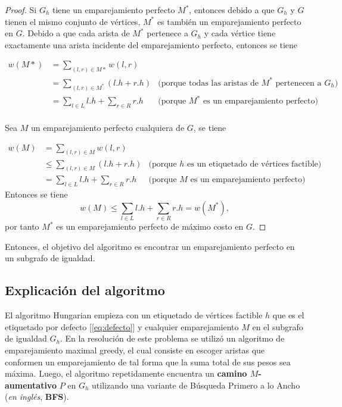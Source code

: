 \documentclass[10pt]{article} %
\begin{document}
	\begin{proof}
		Si $G_h$ tiene un emparejamiento perfecto $M^*$, entonces debido a que $G_h$ y $G$ tienen el mismo conjunto de v\'ertices, $M^*$ es tambi\'en un emparejamiento perfecto en $G$. Debido a que cada arista de $M^*$ pertenece a $G_h$ y cada v\'ertice tiene exactamente una arista incidente del emparejamiento perfecto, entonces se tiene
		
		\begin{align}
			w(M*) &= \sum_{(l,r) \in M*} w(l,r)\\
			&= \sum_{(l,r) \in M^*}(l.h + r.h) &\text{(porque todas las aristas de $M^*$ pertenecen a $G_h$)}\\
			&= \sum_{l \in L}l.h + \sum_{r \in R} r.h &\text{(porque $M^{*}$ es un emparejamiento perfecto)}\\
		\end{align} 
		
		Sea $M$ un emparejamiento perfecto cualquiera de $G$, se tiene
		
		\begin{align}
			w(M) &= \sum_{(l,r) \in M} w(l,r)\\
			&\leq \sum_{(l,r) \in M} (l.h + r.h) &\text{(porque $h$ es un etiquetado de v\'ertices factible)}\\
			&= \sum_{l \in L} l.h + \sum_{r \in R} r.h &\text{(porque $M$ es un emparejamiento perfecto)}
		\end{align}
		Entonces se tiene
		\begin{equation}
			w(M) \leq \sum_{l \in L} l.h + \sum_{r \in R} r.h = w(M^*),
		\end{equation}
		por tanto $M^*$ es un emparejamiento perfecto de m\'aximo costo en $G$.
	\end{proof}
	
	Entonces, el objetivo del algoritmo es encontrar un emparejamiento perfecto en un subgrafo de igualdad. 
	
	\subsection{Explicaci\'on del algoritmo}
	
	
	El algoritmo Hungarian empieza con un etiquetado de v\'ertices factible $h$ que es el etiquetado por defecto [\ref{eq:defecto}] y cualquier emparejamiento $M$ en el subgrafo de igualdad $G_h$.  En la resoluci\'on de este problema se utiliz\'o un algoritmo de emparejamiento maximal greedy, el cual consiste en escoger aristas que conformen un emparejamiento de tal forma que la suma total de sus pesos  sea m\'axima. Luego, el algoritmo repetidamente encuentra un \textbf{camino $M$-aumentativo} $P$ en $G_h$ utilizando una variante de B\'usqueda Primero a lo Ancho (\textit{en ingl\'es}, \textbf{BFS}). 
	
\end{document}
